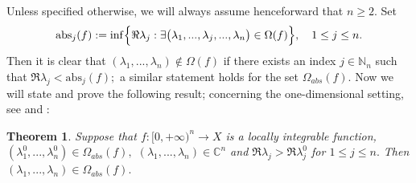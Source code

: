 \documentclass{amsart}
\newtheorem{thm}{Theorem}[section]
\theoremstyle{definition}
\theoremstyle{remark}
\numberwithin{equation}{section}
\begin{document}
Unless specified otherwise, we will always assume henceforward that $n\geq 2.$ Set
$$
\text{abs}_{j}(f):=\inf \Bigl\{ \Re \lambda_{j} : \exists \bigl(\lambda_{1},...,\lambda_{j},...,\lambda_{n}\bigr)\in \Omega(f)\Bigr\},\quad 1\le j\leq n.
$$
Then it is clear that $(\lambda_{1},...,\lambda_{n})\notin \Omega(f)$ if there exists an index $j\in {\mathbb N}_{n}$ such that $\Re \lambda_{j}<\text{abs}_{j}(f);$ a similar statement holds for the set $\Omega_{abs}(f).$
Now we will state and prove the following result; concerning the one-dimensional setting, see \cite[Proposition 1.4.1]{a43} and \cite[Theorem 1.4.1(i)]{FKP}:

\begin{thm}\label{dl}
Suppose that $f: [0,+\infty)^{n}\rightarrow X$ is a locally integrable function, $(\lambda_{1}^{0},...,\lambda_{n}^{0})\in \Omega_{abs}(f),$  $(\lambda_{1},...,\lambda_{n})\in {\mathbb C}^{n}$ and $\Re \lambda_{j} >\Re \lambda_{j}^{0}$ for $1\leq j\leq n.$ Then $(\lambda_{1},...,\lambda_{n})\in \Omega_{abs}(f).$
\end{thm}
\end{document}
